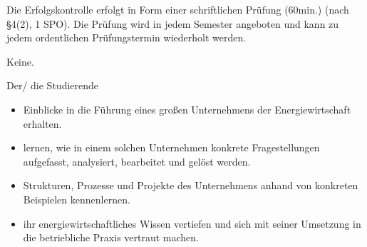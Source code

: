 \begin{course}

\setdoclanguagegerman
{}



\coursehead


\label{cour_13749.dp_997}


\begin{styleenv}
\begin{assessment}
Die Erfolgskontrolle erfolgt in Form einer schriftlichen Prüfung (60min.) (nach §4(2), 1 SPO). Die Prüfung wird in jedem Semester angeboten und kann zu jedem ordentlichen Prüfungstermin wiederholt werden.


\end{assessment}

\begin{conditions}Keine.\end{conditions}


\end{styleenv}

\begin{learningoutcomes}
Der/ die Studierende

 \begin{itemize}\item Einblicke in die Führung eines großen Unternehmens der Energiewirtschaft erhalten.  \end{itemize}\begin{itemize}\item lernen, wie in einem solchen Unternehmen konkrete Fragestellungen aufgefasst, analysiert, bearbeitet und gelöst werden.  \item Strukturen, Prozesse und Projekte des Unternehmens anhand von konkreten Beispielen kennenlernen.  \item ihr energiewirtschaftliches Wissen vertiefen und sich mit seiner Umsetzung in die betriebliche Praxis vertraut machen.   \end{itemize}
\end{learningoutcomes}


\end{course}
